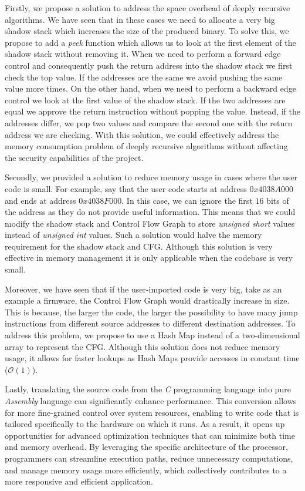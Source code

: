Firstly, we propose a solution to address the space overhead of deeply recursive
algorithms. We have seen that in these cases we need to allocate a very big shadow
stack which increases the size of the produced binary. To solve this, we propose
to add a \textit{peek} function which allows us to look at the first element of
the shadow stack without removing it. When we need to perform a forward edge control
and consequently push the return address into the shadow stack we first check the
top value. If the addresses are the same we avoid pushing the same value more
times. On the other hand, when we need to perform a backward edge control we
look at the first value of the shadow stack. If the two addresses are equal we approve
the return instruction without popping the value. Instead, if the addresses differ,
we pop two values and compare the second one with the return address we are
checking. With this solution, we could effectively address the memory
consumption problem of deeply recursive algorithms without affecting the
security capabilities of the project.

Secondly, we provided a solution to reduce memory usage in cases where the user code
is small. For example, say that the user code starts at address $0x4038A000$ and
ends at address $0x4038F000$. In this case, we can ignore the first $16$ bits of
the address as they do not provide useful information. This means that we could
modify the shadow stack and Control Flow Graph to store \textit{unsigned short} values
instead of \textit{unsigned int} values. Such a solution would halve the memory requirement
for the shadow stack and CFG. Although this solution is very effective in memory
management it is only applicable when the codebase is very small.

Moreover, we have seen that if the user-imported code is very big, take as an
example a firmware, the Control Flow Graph would drastically increase in size.
This is because, the larger the code, the larger the possibility to have many
jump instructions from different source addresses to different destination
addresses. To address this problem, we propose to use a Hash Map instead of a
two-dimensional array to represent the CFG. Although this solution does not reduce
memory usage, it allows for faster lookups as Hash Maps provide accesses in
constant time ($\mathcal{O}(1)$).

Lastly, translating the source code from the \textit{C} programming language
into pure \textit{Assembly} language can significantly enhance performance. This
conversion allows for more fine-grained control over system resources, enabling to
write code that is tailored specifically to the hardware on which it runs. As a
result, it opens up opportunities for advanced optimization techniques that can minimize
both time and memory overhead. By leveraging the specific architecture of the
processor, programmers can streamline execution paths, reduce unnecessary
computations, and manage memory usage more efficiently, which collectively
contributes to a more responsive and efficient application.

